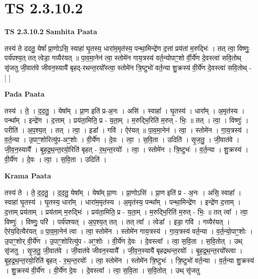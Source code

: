 \documentclass[17pt]{extarticle}
\begin{document}
\section*{ TS 2.3.10.2 }

\textbf{TS 2.3.10.2 } \newline
\textbf{Samhita Paata} \newline

तस्य॑ ते ददतु॒ येषां᳚ प्रा॒णोऽसि॒ स्वाहा॑ घृ॒तस्य॒ धारा॑म॒मृत॑स्य॒ पन्था॒मिन्द्रे॑ण द॒त्तां प्रय॑तां म॒रुद्भिः॑ । तत् त्वा॒ विष्णुः॒ पर्य॑पश्य॒त् तत् त्वेडा॒ गव्यैर॑यत् ॥ पा॒व॒मा॒नेन॑ त्वा॒ स्तोमे॑न गाय॒त्रस्य॑ वर्त॒न्योपाꣳ॒॒शो र्वी॒र्ये॑ण दे॒वस्त्वा॑ सवि॒तोथ् सृ॑जतु जी॒वात॑वे जीवन॒स्यायै॑ बृहद्-रथन्त॒रयो᳚स्त्वा॒ स्तोमे॑न त्रि॒ष्टुभो॑ वर्त॒न्या शु॒क्रस्य॑ वी॒र्ये॑ण दे॒वस्त्वा॑ सवि॒तोथ् - [  ] \newline

\textbf{Pada Paata} \newline

तस्य॑ । ते॒ । द॒द॒तु॒ । येषा᳚म् । प्रा॒ण इति॑ प्र-अ॒नः । असि॑ । स्वाहा᳚ । घृ॒तस्य॑ । धारा᳚म् । अ॒मृत॑स्य । पन्था᳚म् । इन्द्रे॑ण । द॒त्ताम् । प्रय॑ता॒मिति॒ प्र - य॒ता॒म् । म॒रुद्भि॒रिति॑ म॒रुत् - भिः॒ ॥ तत् । त्वा॒ । विष्णुः॑ । परीति॑ । अ॒प॒श्य॒त् । तत् । त्वा॒ । इडा᳚ । गवि॑ । ऐर॑यत् ॥ पा॒व॒मा॒नेन॑ । त्वा॒ । स्तोमे॑न । गा॒य॒त्रस्य॑ । व॒र्त॒न्या । उ॒पाꣳ॒॒शोरित्यु॑प-अꣳ॒॒शोः । वी॒र्ये॑ण । दे॒वः । त्वा॒ । स॒वि॒ता । उदिति॑ । सृ॒ज॒तु॒ । जी॒वात॑वे । जी॒व॒न॒स्यायै᳚ । बृ॒ह॒द्र॒थ॒न्त॒रयो॒रिति॑ बृहत् - र॒थ॒न्त॒रयोः᳚ । त्वा॒ । स्तोमे॑न । त्रि॒ष्टुभः॑ । व॒र्त॒न्या । शु॒क्रस्य॑ । वी॒र्ये॑ण । दे॒वः । त्वा॒ । स॒वि॒ता । उदिति॑ ।  \newline


\textbf{Krama Paata} \newline

तस्य॑ ते । ते॒ द॒द॒तु॒ । द॒द॒तु॒ येषा᳚म् । येषा᳚म् प्रा॒णः । प्रा॒णोऽसि॑ । प्रा॒ण इति॑ प्र - अ॒नः । असि॒ स्वाहा᳚ । स्वाहा॑ घृ॒तस्य॑ । घृ॒तस्य॒ धारा᳚म् । धारा॑म॒मृत॑स्य । अ॒मृत॑स्य॒ पन्था᳚म् । पन्था॒मिन्द्रे॑ण । इन्द्रे॑ण द॒त्ताम् । द॒त्ताम् प्रय॑ताम् । प्रय॑ताम् म॒रुद्भिः॑ । प्रय॑ता॒मिति॒ प्र - य॒ता॒म् । म॒रुद्भि॒रिति॑ म॒रुत् - भिः॒ ॥ तत् त्वा᳚ । त्वा॒ विष्णुः॑ । विष्णुः॒ परि॑ । पर्य॑पश्यत् । अ॒प॒श्य॒त् तत् । तत् त्वा᳚ । त्वेडा᳚ । इडा॒ गवि॑ । गव्यैर॑यत् । ऐर॑य॒दित्यैर॑यत् ॥ पा॒व॒मा॒नेन॑ त्वा । त्वा॒ स्तोमे॑न । स्तोमे॑न गाय॒त्रस्य॑ । गा॒य॒त्रस्य॑ वर्त॒न्या । व॒र्त॒न्यो॒पाꣳ॒॒शोः । उ॒पाꣳ॒॒शोर् वी॒र्ये॑ण । उ॒पाꣳ॒॒शोरित्यु॑प - अꣳ॒॒शोः । वी॒र्ये॑ण दे॒वः । दे॒वस्त्वा᳚ । त्वा॒ स॒वि॒ता । स॒वि॒तोत् । उथ् सृ॑जतु । सृ॒ज॒तु॒ जी॒वात॑वे । जी॒वात॑वे जीवन॒स्यायै᳚ । जी॒व॒न॒स्यायै॑ बृहद्रथन्त॒रयोः᳚ । बृ॒ह॒द्र॒थ॒न्त॒रयो᳚स्त्वा । बृ॒ह॒द्र॒थ॒न्त॒रयो॒रिति॑ बृहत् - र॒थ॒न्त॒रयोः᳚ । त्वा॒ स्तोमे॑न । स्तोमे॑न त्रि॒ष्टुभः॑ । त्रि॒ष्टुभो॑ वर्त॒न्या । व॒र्त॒न्या शु॒क्रस्य॑ । शु॒क्रस्य॑ वी॒र्ये॑ण । वी॒र्ये॑ण दे॒वः । दे॒वस्त्वा᳚ । त्वा॒ स॒वि॒ता । स॒वि॒तोत् । उथ् सृ॑जतु \newline
\end{document}
